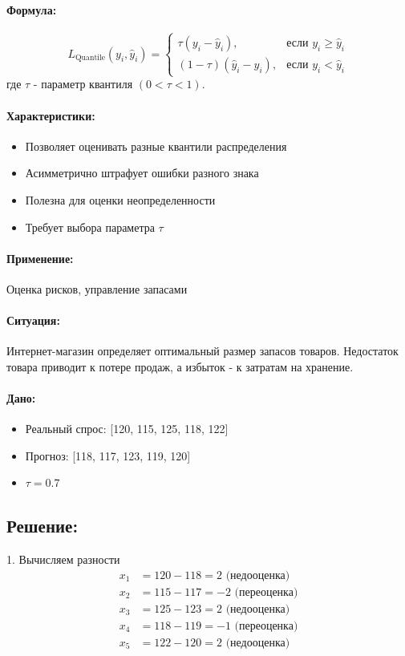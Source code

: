 \paragraph{Формула:}

\[
    L_{\text{Quantile}}(y_i, \hat{y}_i) =
    \begin{cases}
        \tau (y_i - \hat{y}_i),       & \text{если } y_i \geq \hat{y}_i \\
        (1 - \tau) (\hat{y}_i - y_i), & \text{если } y_i < \hat{y}_i
    \end{cases}
\]
где $\tau$ - параметр квантиля $(0 < \tau < 1)$.

\paragraph{Характеристики:}
\begin{itemize}
    \item Позволяет оценивать разные квантили распределения
    \item Асимметрично штрафует ошибки разного знака
    \item Полезна для оценки неопределенности
    \item Требует выбора параметра $\tau$
\end{itemize}

\paragraph{Применение:} Оценка рисков, управление запасами

\paragraph{Ситуация:} Интернет-магазин определяет оптимальный размер запасов товаров. Недостаток товара приводит к потере продаж, а избыток - к затратам на хранение.

\paragraph{Дано:}
\begin{itemize}
    \item Реальный спрос: [120, 115, 125, 118, 122]
    \item Прогноз: [118, 117, 123, 119, 120]
    \item $\tau = 0.7$
\end{itemize}

\subsection*{Решение:}
1. Вычисляем разности
\[
    \begin{aligned}
        x_1 & = 120 - 118 = 2 \text{ (недооценка)}  \\
        x_2 & = 115 - 117 = -2 \text{ (переоценка)} \\
        x_3 & = 125 - 123 = 2 \text{ (недооценка)}  \\
        x_4 & = 118 - 119 = -1 \text{ (переоценка)} \\
        x_5 & = 122 - 120 = 2 \text{ (недооценка)}
    \end{aligned}
\]

